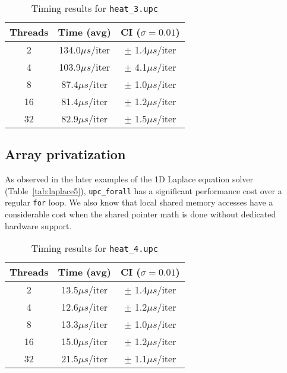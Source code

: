 \documentclass[12pt]{article}
\newcommand{\us}[0]{${\mu}s$}
\begin{document}
\begin{table}[ht]
  \centering\begin{tabular}{|c|c|c|}
    \hline
    Threads & Time (avg) & CI ($\sigma=0.01$) \\
    \hline
    2 & 134.0\us/iter & $\pm$ 1.4\us/iter \\
    4 & 103.9\us/iter & $\pm$ 4.1\us/iter \\
    8 & 87.4\us/iter & $\pm$ 1.0\us/iter \\
    16 & 81.4\us/iter & $\pm$ 1.2\us/iter \\
    32 & 82.9\us/iter & $\pm$ 1.5\us/iter \\
    \hline
  \end{tabular}
  \caption{Timing results for \texttt{heat\_3.upc}}
  \label{tab:heat3}
\end{table}

\subsection{Array privatization}

As observed in the later examples of the 1D Laplace equation solver (Table~\ref{tab:laplace5}), \texttt{upc\_forall} has a significant performance cost over a regular \texttt{for} loop.
We also know that local shared memory accesses have a considerable cost when the shared pointer math is done without dedicated hardware support. %

\begin{table}[ht]
  \centering\begin{tabular}{|c|c|c|}
    \hline
    Threads & Time (avg) & CI ($\sigma=0.01$) \\
    \hline
    2 & 13.5\us/iter & $\pm$ 1.4\us/iter \\
    4 & 12.6\us/iter & $\pm$ 1.2\us/iter \\
    8 & 13.3\us/iter & $\pm$ 1.0\us/iter \\
    16 & 15.0\us/iter & $\pm$ 1.2\us/iter \\
    32 & 21.5\us/iter & $\pm$ 1.1\us/iter \\
    \hline
  \end{tabular}
  \caption{Timing results for \texttt{heat\_4.upc}}
  \label{tab:heat4}
\end{table}
\end{document}
